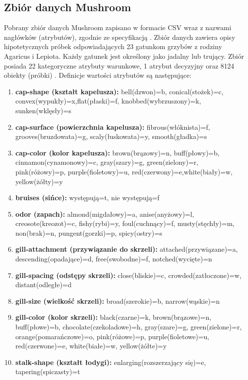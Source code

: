 \documentclass[10pt,a4paper]{article}
\begin{document}
\subsection{Zbiór danych Mushroom}
Pobrany zbiór danych Mushroom zapisano w formacie CSV wraz z nazwami nagłówków (atrybutów), zgodnie ze specyfikacją . Zbiór danych zawiera opisy hipotetycznych próbek odpowiadających 23 gatunkom grzybów z rodziny Agaricus i Lepiota. Każdy gatunek jest określony jako jadalny lub trujący. Zbiór posiada 22 kategoryczne atrybuty warunkowe, 1 atrybut decyzyjny oraz 8124 obiekty (próbki) \cite{MushroomDS}. Definicje wartości atrybutów są następujące:
\begin{flushleft}
	\begin{enumerate}
		\item \textbf{cap-shape (kształt kapelusza):} bell(dzwon)=b, conical(stożek)=c, convex(wypukły)=x,flat(płaski)=f, knobbed(wybrzuszony)=k, sunken(wklęsły)=s
		\item \textbf{cap-surface (powierzchnia kapelusza):} fibrous(włóknista)=f, grooves(bruzdowata)=g, scaly(łuskowata)=y, smooth(gładka)=s
		\item \textbf{cap-color (kolor kapelusza):} brown(brązowy)=n, buff(płowy)=b, cinnamon(cynamonowy)=c, gray(szary)=g, green(zielony)=r, pink(różowy)=p, purple(fioletowy)=u, red(czerwony)=e,white(biały)=w, yellow(żółty)=y
		\item \textbf{bruises (sińce):} występują=t, nie występują=f
		\item \textbf{odor (zapach):} almond(migdałowy)=a, anise(anyżowy)=l, creosote(kreozot)=c, fishy(rybi)=y, foul(cuchnący)=f, musty(stęchły)=m, non(brak)=n, pungent(gorzki)=p, spicy(ostry)=s
		\item \textbf{gill-attachment (przywiązanie do skrzeli):} attached(przywiązane)=a, descending(opadające)=d, free(swobodne)=f, notched(wycięte)=n
		\item \textbf{gill-spacing (odstępy skrzeli):} close(bliskie)=c, crowded(zatłoczone)=w, distant(odległe)=d
		\item \textbf{gill-size (wielkość skrzeli):} broad(szerokie)=b, narrow(wąskie)=n
		\item \textbf{gill-color (kolor skrzeli):} black(czarne)=k, brown(brązowe)=n, buff(płowe)=b, chocolate(czekoladowe)=h, gray(szare)=g, green(zielone)=r, orange(pomarańczowe)=o, pink(różowe)=p, purple(fioletowe)=u, red(czerwone)=e, white(białe)=w, yellow(żółte)=y
		\item \textbf{stalk-shape (kształt łodygi):} enlarging(rozszerzający się)=e, tapering(spiczasty)=t

\end{enumerate}
\end{flushleft}
\end{document}
